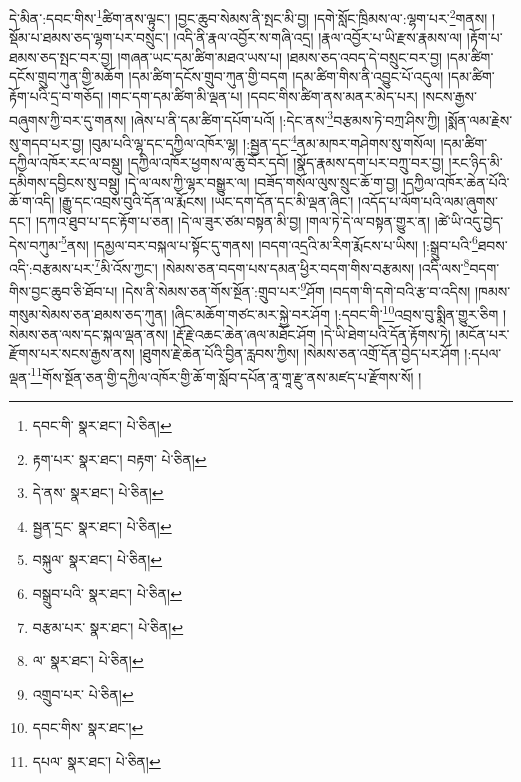 དེ་མིན་:དབང་གིས་\footnote{དབང་གི་  སྣར་ཐང་།  པེ་ཅིན། }ཚིག་ནས་ལྟུང་། །བྱང་ཆུབ་སེམས་ནི་སྤང་མི་བྱ། །དགེ་སློང་ཁྲིམས་ལ་:ལྷག་པར་\footnote{རྟག་པར་  སྣར་ཐང་། བརྟག་  པེ་ཅིན། }གནས། །སྡོམ་པ་ཐམས་ཅད་ལྷག་པར་བསྲུང་། །འདི་ནི་རྣལ་འབྱོར་ས་གཞི་འདྲ། །རྣལ་འབྱོར་པ་ཡི་རྫས་རྣམས་ལ། །རྟོག་པ་ཐམས་ཅད་སྤང་བར་བྱ། །གཞན་ཡང་དམ་ཚིག་མཐའ་ཡས་པ། །ཐམས་ཅད་འབད་དེ་བསྲུང་བར་བྱ། །དམ་ཚིག་དངོས་གྲུབ་ཀུན་གྱི་མཆོག །དམ་ཚིག་དངོས་གྲུབ་ཀུན་གྱི་བདག །དམ་ཚིག་གིས་ནི་འབྱུང་པོ་འདུལ། །དམ་ཚིག་རྟོག་པའི་དྲ་བ་གཅོད། །གང་དག་དམ་ཚིག་མི་ལྡན་པ། །དབང་གིས་ཚིག་ནས་མནར་མེད་པར། །སངས་རྒྱས་བཞུགས་ཀྱི་བར་དུ་གནས། །ཞེས་པ་ནི་དམ་ཚིག་དཔོག་པའོ། །:དེང་ནས་\footnote{དེ་ནས་  སྣར་ཐང་།  པེ་ཅིན། }བརྩམས་ཏེ་བཀྲ་ཤིས་ཀྱི། །སྨོན་ལམ་རྗེས་སུ་གདབ་པར་བྱ། །བུམ་པའི་ལྷ་དང་དཀྱིལ་འཁོར་ལྷ། །:སྦྱན་དང་\footnote{སྦྱན་དྲང་  སྣར་ཐང་།  པེ་ཅིན། }ནམ་མཁར་གཤེགས་སུ་གསོལ། །དམ་ཚིག་དཀྱིལ་འཁོར་རང་ལ་བསྡུ། །དཀྱིལ་འཁོར་ཕྱགས་ལ་ཆུ་བོར་དབོ། །སྣོད་རྣམས་དག་པར་བཀྲུ་བར་བྱ། །རང་ཉིད་མི་དམིགས་དབྱིངས་སུ་བསྡུ། །དེ་ལ་ལས་ཀྱི་ལྷར་བསྒྱུར་ལ། །བཟོད་གསོལ་ལུས་སྲུང་ཆོ་ག་བྱ། །དཀྱིལ་འཁོར་ཆེན་པོའི་ཆོ་ག་འདི། །རྒྱུ་དང་འབྲས་བུའི་དོན་ལ་རྨོངས། །ཡང་དག་དོན་དང་མི་ལྡན་ཞིང་། །འདོད་པ་ལོག་པའི་ལམ་ཞུགས་དང་། །དཀའ་ཐུབ་པ་དང་རྟོག་པ་ཅན། །དེ་ལ་ཟུར་ཙམ་བསྟན་མི་བྱ། །གལ་ཏེ་དེ་ལ་བསྟན་གྱུར་ན། །ཚེ་ཡི་འདུ་བྱེད་དེས་བཀུམ་\footnote{བསྐུལ་  སྣར་ཐང་།  པེ་ཅིན། }ནས། །དམྱལ་བར་བསྐལ་པ་སྟོང་དུ་གནས། །བདག་འདྲའི་མ་རིག་རྨོངས་པ་ཡིས། །:སྒྲུབ་པའི་\footnote{བསྒྲུབ་པའི་  སྣར་ཐང་།  པེ་ཅིན། }ཐབས་འདི་:བརྩམས་པར་\footnote{བརྩམ་པར་  སྣར་ཐང་།  པེ་ཅིན། }མི་འོས་ཀྱང་། །སེམས་ཅན་བདག་པས་དམན་ཕྱིར་བདག་གིས་བརྩམས། །འདི་ལས་\footnote{ལ་  སྣར་ཐང་།  པེ་ཅིན། }བདག་གིས་བྱང་ཆུབ་ཅི་ཐོབ་པ། །དེས་ནི་སེམས་ཅན་གོས་སྔོན་:གྲུབ་པར་\footnote{འགྲུབ་པར་  པེ་ཅིན། }ཤོག །བདག་གི་དགེ་བའི་རྩ་བ་འདིས། །ཁམས་གསུམ་སེམས་ཅན་ཐམས་ཅད་ཀུན། །ཞིང་མཆོག་གཙང་མར་སྐྱེ་བར་ཤོག །:དབང་གི་\footnote{དབང་གིས་  སྣར་ཐང་། }འབྲས་བུ་སྨིན་གྱུར་ཅིག །སེམས་ཅན་ལས་དང་སྐལ་ལྡན་ནས། །རྡོ་རྗེ་འཆང་ཆེན་ཞལ་མཐོང་ཤོག །དེ་ཡི་ཐེག་པའི་དོན་རྟོགས་ཏེ། །མངོན་པར་རྫོགས་པར་སངས་རྒྱས་ནས། །ཐུགས་རྗེ་ཆེན་པོའི་བྱིན་རླབས་ཀྱིས། །སེམས་ཅན་འགྲོ་དོན་བྱེད་པར་ཤོག །:དཔལ་ལྡན་\footnote{དཔལ་  སྣར་ཐང་།  པེ་ཅིན། }གོས་སྔོན་ཅན་གྱི་དཀྱིལ་འཁོར་གྱི་ཆོ་ག་སློབ་དཔོན་ནཱ་གཱ་རྫུ་ནས་མཛད་པ་རྫོགས་སོ། ། 